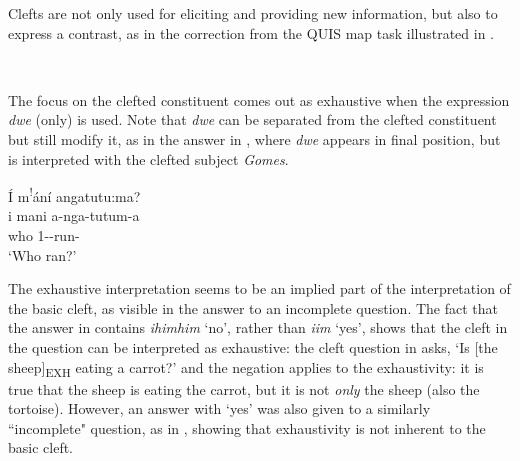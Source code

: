 \documentclass[output=paper]{langscibook}
\begin{document}
Clefts are not only used for eliciting and providing new information, but also to express a contrast, as in the correction from the QUIS map task illustrated in .

\ea\label{bkm:Ref120693591}
\begin{xlist}
 \\


\end{xlist}
\z


The focus on the clefted constituent comes out as exhaustive when the expression \textit{dwe} (only) is used. Note that \textit{dwe} can be separated from the clefted constituent but still modify it, as in the answer in , where \textit{dwe} appears in final position, but is interpreted with the clefted subject \textit{Gomes}.

\ea
\label{bkm:Ref120693710}
\begin{xlist}
Í m\textsuperscript{!}ání angatutu:ma?\\
\gll
i  mani  a-nga-tutum-a\\
\COP{}  who  1\SM{}-\REL{}-run-\FV{}\\
\glt
‘Who ran?’\\


\end{xlist}
\z

The exhaustive interpretation seems to be an implied part of the interpretation of the basic cleft, as visible in the answer to an incomplete question. The fact that the answer in  contains \textit{ihimhim} ‘no’, rather than \textit{iim} ‘yes’, shows that the cleft in the question can be interpreted as exhaustive: the cleft question in  asks, ‘Is [the sheep]\textsubscript{EXH} eating a carrot?’ and the negation applies to the exhaustivity: it is true that the sheep is eating the carrot, but it is not \textit{only} the sheep (also the tortoise). However, an answer with ‘yes’ was also given to a similarly ``incomplete" question, as in , showing that exhaustivity is not inherent to the basic cleft.
\end{document}
